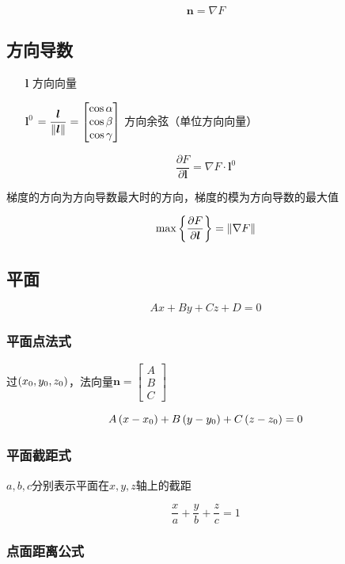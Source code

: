 \documentclass{article}
\begin{document}
\[\boldsymbol n=\nabla F\]

\subsection{方向导数}

\begin{enumerate}
    \item[$\boldsymbol l$] 方向向量
    \item[$\boldsymbol l^0$] $=\dfrac{\boldsymbol l}{\left\Vert\boldsymbol l\right\Vert}=\begin{bmatrix}\cos\alpha\\\cos\beta\\\cos\gamma\end{bmatrix}$ 方向余弦（单位方向向量）
\end{enumerate}

\[\frac{\partial F}{\partial\boldsymbol l}=\nabla F\cdot\boldsymbol l^0\]

梯度的方向为方向导数最大时的方向，梯度的模为方向导数的最大值

\[\max\left\{\frac{\partial F}{\partial\boldsymbol l}\right\}=\left\Vert\nabla F\right\Vert\]

\subsection{平面}

\begin{definition}[]
    \[Ax+By+Cz+D=0\]
\end{definition}

\subsubsection{平面点法式}

过$\left(x_0,y_0,z_0\right)$，法向量$\boldsymbol n=\begin{bmatrix}A\\B\\C\end{bmatrix}$

\[A\left(x-x_0\right)+
    B\left(y-y_0\right)+
    C\left(z-z_0\right)=0\]

\subsubsection{平面截距式}

$a,b,c$分别表示平面在$x,y,z$轴上的截距

\[\frac xa+\frac yb+\frac zc=1\]

\subsubsection{点面距离公式}
\end{document}
